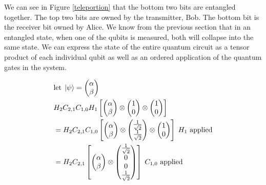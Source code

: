 \documentclass[conference]{IEEEtran}
\begin{document}
We can see in Figure \ref{teleportion} that the bottom two bits are entangled together. The top two bits are owned by the transmitter, Bob. The bottom bit is the receiver bit owned by Alice. We know from the previous section that in an entangled state, when one of the qubits is measured, both will collapse into the same state. We can express the state of the entire quantum circuit as a tensor product of each individual qubit as well as an ordered application of the quantum gates in the system.

\begin{align*}
& \text{let} \; \ket{\psi} = \begin{pmatrix}\alpha\\\beta\end{pmatrix}\\ 
& H_2C_{2,1}C_{1,0}H_1
\left [
\begin{pmatrix} \alpha \\ \beta \end{pmatrix} \otimes \begin{pmatrix} 1 \\ 0\end{pmatrix} \otimes \begin{pmatrix} 1 \\ 0\end{pmatrix}
\right ]\\
&= H_2C_{2,1}C_{1,0}
\left [
\begin{pmatrix} \alpha \\ \beta \end{pmatrix} \otimes \begin{pmatrix} \frac{1}{\sqrt{2}} \\ \frac{1}{\sqrt{2}} \end{pmatrix} \otimes \begin{pmatrix} 1 \\ 0\end{pmatrix} \right ] \; \text{$H_1$ applied}\\
&= H_2C_{2,1} \left [ \begin{pmatrix} \alpha \\ \beta \end{pmatrix} \otimes \begin{pmatrix} \frac{1}{\sqrt{2}} \\ 0 \\ 0 \\ \frac{1}{\sqrt{2}} \end{pmatrix} \right ] \; \text{$C_{1,0}$ applied}\\

\end{align*}
\end{document}
